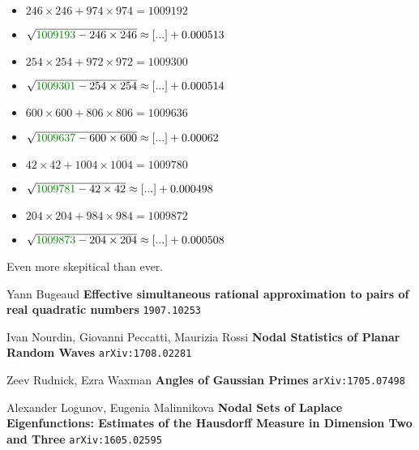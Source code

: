 \documentclass[12pt]{article}
\begin{document}
\begin{multicols}{2}
\begin{itemize}
\item $246×246 + 974×974 = 1009192$
\item $\sqrt{ {\color{green!50!black}{1009193}} - 246\times 246 } \approx [...] + 0.000513$
\item $254×254 + 972×972 = 1009300$
\item $\sqrt{ {\color{green!50!black}{1009301}} - 254\times 254 } \approx [...] + 0.000514$
\item $600×600 + 806×806 = 1009636$
\item $\sqrt{ {\color{green!50!black}{1009637}} - 600\times 600 } \approx [...] + 0.00062$
\item $42×42 + 1004×1004 = 1009780$
\item $\sqrt{ {\color{green!50!black}{1009781}} - 42\times 42 } \approx [...] + 0.000498$
\item $204×204 + 984×984 = 1009872$
\item $\sqrt{ {\color{green!50!black}{1009873}} - 204\times 204 } \approx [...] + 0.000508$
\end{itemize}
\end{multicols}
\noindent Even more skepitical than ever.
\vfill



\begin{thebibliography}{}

\item Yann Bugeaud {\textbf{Effective simultaneous rational approximation to pairs of real quadratic numbers}} \texttt{1907.10253}
\item Ivan Nourdin, Giovanni Peccatti, Maurizia Rossi \textbf{Nodal Statistics of Planar Random Waves} \texttt{arXiv:1708.02281}
\item Zeev Rudnick, Ezra Waxman \textbf{Angles of Gaussian Primes} \texttt{arXiv:1705.07498}
\item Alexander Logunov, Eugenia Malinnikova \textbf{Nodal Sets of Laplace Eigenfunctions: Estimates of the Hausdorff Measure in Dimension Two and Three} \texttt{arXiv:1605.02595}
\end{thebibliography} 
\end{document}

